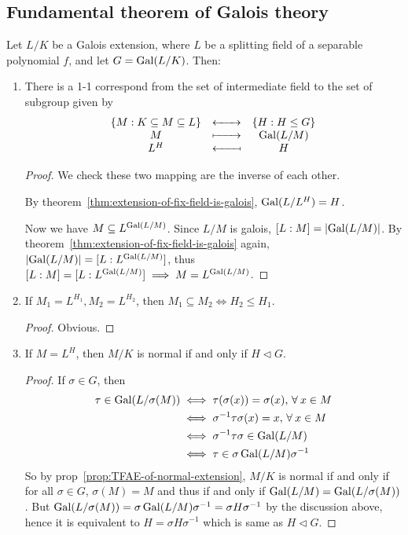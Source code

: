 \subsection{Fundamental theorem of Galois theory}
\begin{theorem}
  Let $L/K$ be a Galois extension, where $L$ be a splitting field of a separable polynomial $f$,
  and let $G = \operatorname{Gal}(L/K)$. Then:

  \begin{enumerate}[(\arabic*)]
    \item There is a 1-1 correspond from the set of intermediate field to the set of subgroup given by
      \[
        \begin{array}{ccc}
          \{ M : K \subseteq M \subseteq L \} & \xleftrightarrow{\quad\quad} & \{ H : H \leq G \} \\
          M & \xmapsto{\quad\quad} & \Gal(L/M) \\
          L^H & \reflectbox{\ensuremath{\xmapsto{\quad\quad}}} & H
        \end{array}
      \]

      \begin{proof}
        We check these two mapping are the inverse of each other.

        By theorem~\ref{thm:extension-of-fix-field-is-galois}, $\operatorname{Gal}(L/L^H) = H$.

        Now we have $M \subseteq L^{\operatorname{Gal}(L/M)}$. Since $L/M$ is galois, $[L: M] = \lvert\operatorname{Gal}(L/M)\rvert$.
        By theorem~\ref{thm:extension-of-fix-field-is-galois} again,
        $\lvert\operatorname{Gal}(L/M)\rvert = [L: L^{\operatorname{Gal}(L/M)}]$, thus $[L: M] = [L: L^{\operatorname{Gal}(L/M)}] \implies M = L^{\operatorname{Gal}(L/M)}$.
      \end{proof}

    \item If $M_1 = L^{H_1}, M_2 = L^{H_2}$, then $M_1 \subseteq M_2 \iff H_2 \leq H_1$.
      \begin{proof}
        Obvious.
      \end{proof}
    \item If $M = L^H$, then $M/K$ is normal if and only if $H \lhd G$.
    \begin{proof}
      If $\sigma \in G$, then
      \begin{align*}
        \tau \in \Gal(L/\sigma(M)) &\iff \tau(\sigma(x)) = \sigma(x), \, \forall x \in M \\
        &\iff \sigma^{-1} \tau \sigma(x) = x, \, \forall x \in M \\
        &\iff \sigma^{-1} \tau \sigma \in \Gal(L/M) \\
        &\iff \tau \in \sigma \Gal(L/M) \sigma^{-1}
      \end{align*}
      So by prop~\ref{prop:TFAE-of-normal-extension}, $M/K$ is normal if and only if for all $\sigma \in G$,
      $\sigma(M) = M$ and thus if and only if $\operatorname{Gal}(L/M) = \operatorname{Gal}(L/\sigma(M))$.
      But $\operatorname{Gal}(L/\sigma(M)) = \sigma \operatorname{Gal}(L/M) \sigma^{-1} = \sigma H \sigma^{-1}$ by the discussion
      above, hence it is equivalent to $H = \sigma H \sigma^{-1}$ which is same as $H \lhd G$.
    \end{proof}


\end{enumerate}
\end{theorem}
